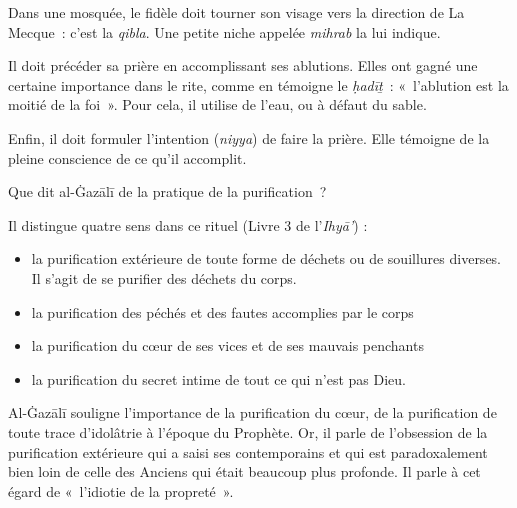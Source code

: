 Dans une mosquée, le fidèle doit tourner son visage vers la direction de
La Mecque~: c'est la \emph{qibla}. Une petite niche appelée
\emph{mihrab} la lui indique.




Il doit précéder sa prière en accomplissant ses ablutions. Elles ont
gagné une certaine importance dans le rite, comme en témoigne le
\emph{ḥadīṯ}~: «~l'ablution est la moitié de la foi~». Pour cela, il utilise de l'eau, ou à défaut
du sable.

Enfin, il doit formuler l'intention (\emph{niyya}) de faire la prière.
Elle témoigne de la pleine conscience de ce qu'il accomplit.

Que dit al-Ġazālī \label{theol:AlGazali11} de la pratique de la purification~?

Il distingue quatre sens dans ce rituel (Livre 3 de l'\emph{Ihyā'}) :

\begin{itemize}
\item
  la purification extérieure de toute forme de déchets ou de souillures
  diverses. Il s'agit de se purifier des déchets du corps.
\item
  la purification des péchés et des fautes accomplies par le corps
\item
  la purification du cœur de ses vices et de ses mauvais penchants
\item
  la purification du secret intime de tout ce qui n'est pas Dieu.
\end{itemize}

Al-Ġazālī \label{theol:AlGazali12} souligne l'importance de la purification du cœur, de la
purification de toute trace d'idolâtrie à l'époque du Prophète. Or, il
parle de l'obsession de la purification extérieure qui a saisi ses
contemporains et qui est paradoxalement bien loin de celle des Anciens
qui était beaucoup plus profonde. Il parle à cet égard de «~l'idiotie de
la propreté~».

